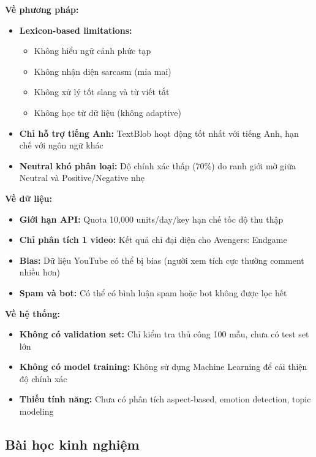 \textbf{Về phương pháp:}
\begin{itemize}
    \item \textbf{Lexicon-based limitations:}
    \begin{itemize}
        \item Không hiểu ngữ cảnh phức tạp
        \item Không nhận diện sarcasm (mỉa mai)
        \item Không xử lý tốt slang và từ viết tắt
        \item Không học từ dữ liệu (không adaptive)
    \end{itemize}
    
    \item \textbf{Chỉ hỗ trợ tiếng Anh:} TextBlob hoạt động tốt nhất với tiếng Anh, hạn chế với ngôn ngữ khác
    
    \item \textbf{Neutral khó phân loại:} Độ chính xác thấp (70\%) do ranh giới mờ giữa Neutral và Positive/Negative nhẹ
\end{itemize}

\textbf{Về dữ liệu:}
\begin{itemize}
    \item \textbf{Giới hạn API:} Quota 10,000 units/day/key hạn chế tốc độ thu thập
    \item \textbf{Chỉ phân tích 1 video:} Kết quả chỉ đại diện cho Avengers: Endgame
    \item \textbf{Bias:} Dữ liệu YouTube có thể bị bias (người xem tích cực thường comment nhiều hơn)
    \item \textbf{Spam và bot:} Có thể có bình luận spam hoặc bot không được lọc hết
\end{itemize}

\textbf{Về hệ thống:}
\begin{itemize}
    \item \textbf{Không có validation set:} Chỉ kiểm tra thủ công 100 mẫu, chưa có test set lớn
    \item \textbf{Không có model training:} Không sử dụng Machine Learning để cải thiện độ chính xác
    \item \textbf{Thiếu tính năng:} Chưa có phân tích aspect-based, emotion detection, topic modeling
\end{itemize}

\subsection{Bài học kinh nghiệm}

